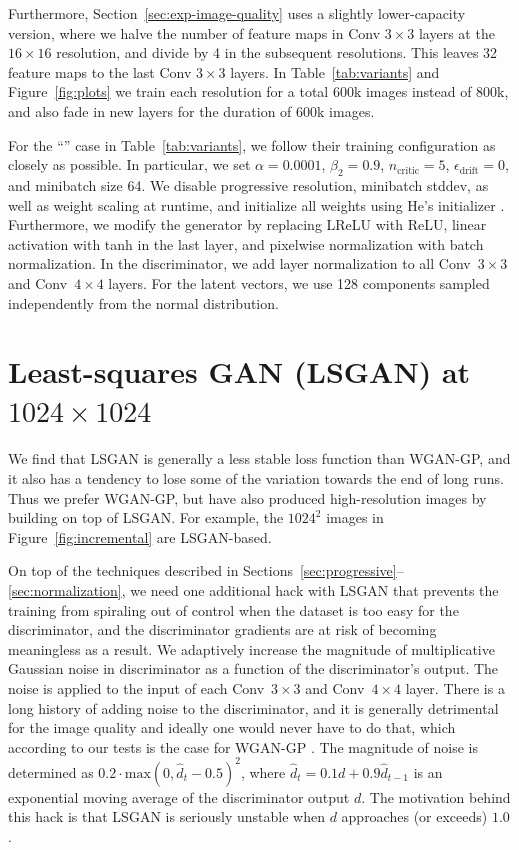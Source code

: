 \documentclass{article}
\begin{document}
Furthermore, Section~\ref{sec:exp-image-quality} uses a slightly lower-capacity version, where we halve the number of feature maps in Conv $3\times3$ layers at the $16\times16$ resolution, and divide by 4 in the subsequent resolutions. This leaves 32 feature maps to the last Conv $3\times3$ layers.
In Table~\ref{tab:variants} and Figure~\ref{fig:plots} we train each resolution for a total 600k images instead of 800k, and also fade in new layers for the duration of 600k images.

For the ``\cite{Gulrajani2017}'' case in Table~\ref{tab:variants}, we follow their training configuration as closely as possible.
In particular, we set $\alpha=0.0001$, $\beta_2=0.9$, $n_\mathrm{critic}=5$, $\epsilon_\mathrm{drift}=0$, and minibatch size 64.
We disable progressive resolution, minibatch stddev, as well as weight scaling at runtime, and initialize all weights using He's initializer \citep{He2015}.
Furthermore, we modify the generator by replacing LReLU with ReLU, linear activation with tanh in the last layer, and pixelwise normalization with batch normalization.
In the discriminator, we add layer normalization to all Conv~$3\times3$ and Conv~$4\times4$ layers.
For the latent vectors, we use 128 components sampled independently from the normal distribution.

\section{Least-squares GAN (LSGAN) at $1024\times1024$}
\label{sec:LSGAN}

We find that LSGAN is generally a less stable loss function than WGAN-GP, and it also has a tendency to lose some of the variation towards the end of long runs. Thus we prefer WGAN-GP, but have also produced high-resolution images by building on top of LSGAN. For example, the $1024^2$ images in Figure~\ref{fig:incremental} are LSGAN-based. 

On top of the techniques described in Sections~\ref{sec:progressive}--\ref{sec:normalization}, we need one additional hack with LSGAN that prevents the training from spiraling out of control when the dataset is too easy for the discriminator, and the discriminator gradients are at risk of becoming meaningless as a result. 
We adaptively increase the magnitude of multiplicative Gaussian noise in discriminator as a function of the discriminator's output. The noise is applied to the input of each Conv~$3\times3$ and Conv~$4\times4$ layer. There is a long history of adding noise to the discriminator, and it is generally detrimental for the image quality \citep{Arjovsky2017} and ideally one would never have to do that, which according to our tests is the case for WGAN-GP \citep{Gulrajani2017}. The magnitude of noise is determined as $0.2\cdot\mathrm{max}(0,\hat{d}_t - 0.5)^2$, where $\hat{d}_t = 0.1d + 0.9\hat{d}_{t-1}$ is an exponential moving average of the discriminator output $d$. The motivation behind this hack is that LSGAN is seriously unstable when $d$ approaches (or exceeds) $1.0$.
\end{document}
